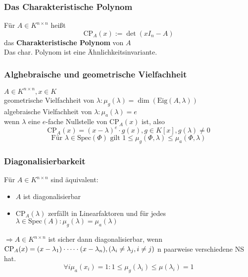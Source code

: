 \documentclass{kit}
\begin{document}
    \subsubsection{Das Charakteristische Polynom}
      Für $A\in K^{n\times n}$ heißt
      $$\text{CP}_A(x):=\det(xI_n-A)$$
      das \textbf{Charakteristische Polynom} von $A$\\
      Das char. Polynom ist eine Ähnlichkeitsinvariante.
    \subsubsection{Alghebraische und geometrische Vielfachheit}
      $A\in K^{n\times n},x\in K$\\
      geometrische Vielfachheit von $\lambda: \mu_g(\lambda)=\dim(\text{Eig}(A,\lambda))$\\
      algebraische Vielfachheit von $\lambda:\mu_a(\lambda)=e$\\
      wenn $\lambda$ eine $e$-fache Nullstelle von $\text{CP}_A(x)$ ist, also
      $$\text{CP}_A(x)=(x-\lambda)^e\cdot g(x), g\in K[x], g(\lambda)\neq0$$
      $$\text{Für }\lambda\in\text{Spec}(\Phi)\text{ gilt }1\le\mu_g(\Phi,\lambda)\le\mu_a(\Phi,\lambda)$$
    \subsubsection{Diagonalisierbarkeit}
      Für $A\in K^{n\times n}$ sind äquivalent:
      \begin{itemize}
        \item $A$ ist diagonalisierbar
        \item $\text{CP}_A(\lambda)$ zerfällt in Linearfaktoren und für jedes $\lambda\in\text{Spec}(A):\mu_g(\lambda)=\mu_a(\lambda)$
      \end{itemize}
      $\Longrightarrow A\in K^{n\times n}$ ist sicher dann diagonalisierbar, wenn $\text{CP}_A(x)=(x-\lambda_1)\cdot\dots\cdot(x-\lambda_n),\\
      (\lambda_i\neq\lambda_j,i\neq j)$ n paarweise verschiedene NS hat.
      $$\forall i \mu_a(x_i)=1: 1\le\mu_g(\lambda_i)\le\mu(\lambda_i)=1$$
\end{document}
